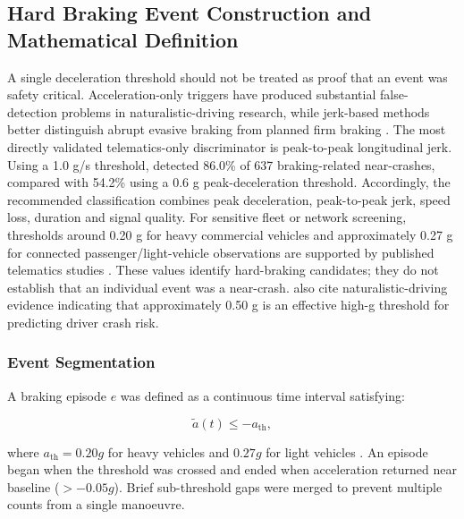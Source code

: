 \documentclass[letterpaper,8pt]{extarticle}  %
\begin{document}
\begin{doublespacing}
\begin{linenumbers}
\subsection{Hard Braking Event Construction and Mathematical Definition}
\label{sec:hb-construction}
A single deceleration threshold should not be treated as proof that an event was safety critical. Acceleration-only triggers have produced substantial false-detection problems in naturalistic-driving research, while jerk-based methods better distinguish abrupt evasive braking from planned firm braking  \citep{Dingus2006TheExperiment,McLaughlin2008AData, Bagdadi2013AssessingStudies}. The most directly validated telematics-only discriminator is peak-to-peak longitudinal jerk. Using a 1.0 g/s threshold, \citet{Bagdadi2013AssessingStudies} detected 86.0\% of 637 braking-related near-crashes, compared with 54.2\% using a 0.6 g peak-deceleration threshold. Accordingly, the recommended classification combines peak deceleration, peak-to-peak jerk, speed loss, duration and signal quality.
For sensitive fleet or network screening, thresholds around 0.20 g for heavy commercial vehicles and approximately 0.27 g for connected passenger/light-vehicle observations are supported by published telematics studies \citep{Desai2020CorrelatingIndiana,Hossain2026EvaluatingTelematics}. These values identify hard-braking candidates; they do not establish that an individual event was a near-crash. \cite{Liu2023Smartphone-basedServices} also cite naturalistic-driving evidence indicating that approximately 0.50 g is an effective high-g threshold for predicting driver crash risk.




\subsubsection*{Event Segmentation}

A braking episode $e$ was defined as a continuous time interval satisfying:

\begin{equation}
\tilde{a}(t) \leq -a_{\text{th}},
\end{equation}

where $a_{\text{th}} = 0.20g$ for heavy vehicles and $0.27g$ for light vehicles \citep{Desai2020CorrelatingIndiana}. An episode began when the threshold was crossed and ended when acceleration returned near baseline ($>-0.05g$). Brief sub-threshold gaps were merged to prevent multiple counts from a single manoeuvre.


\end{linenumbers}
\end{doublespacing}
\end{document}
